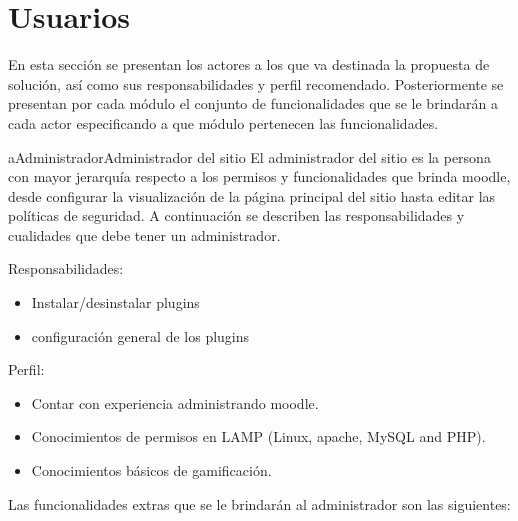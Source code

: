\section{Usuarios}
\label{analisis:usuarios}

 En esta sección se presentan los actores a los que va destinada la propuesta de
 solución, así como sus responsabilidades y perfil recomendado. Posteriormente se
 presentan por cada módulo el conjunto de funcionalidades que se le brindarán a
 cada actor especificando a que módulo pertenecen las funcionalidades.


    \begin{actor}{aAdministrador}{Administrador del sitio}{%
    El administrador del sitio es la persona con mayor jerarquía respecto a los
    permisos y funcionalidades que brinda moodle, desde configurar la visualización
    de la página principal del sitio hasta editar las políticas de seguridad. A
    continuación se describen las responsabilidades y cualidades que debe tener
    un administrador.\\}

    \item[Responsabilidades:] \hfill
        \begin{itemize}
        \item Instalar/desinstalar plugins
        \item configuración general de los plugins
        \end{itemize}

    \item[Perfil:] \hfill
        \begin{itemize}
        \item Contar con experiencia administrando moodle.
        \item Conocimientos de permisos en LAMP (Linux, apache, MySQL and PHP).
        \item Conocimientos básicos de gamificación.\\
        \end{itemize}
    \end{actor}

    \noindent
    Las funcionalidades extras que se le brindarán al administrador son las siguientes:

